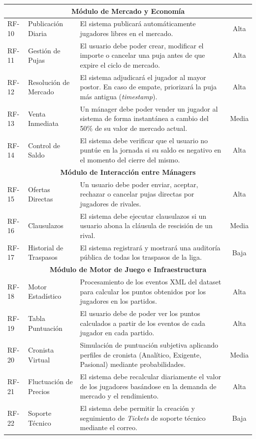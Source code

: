 \begin{center}
\begin{longtable}{|l|p{3.5cm}|p{7cm}|c|}
    \multicolumn{4}{|c|}{\textbf{Módulo de Mercado y Economía}} \\
    \hline
    RF-10 & Publicación Diaria & El sistema publicará automáticamente jugadores libres en el mercado. & Alta \\ \hline
    RF-11 & Gestión de Pujas & El usuario debe poder crear, modificar el importe o cancelar una puja antes de que expire el ciclo de mercado. & Alta \\ \hline
    RF-12 & Resolución de Mercado & El sistema adjudicará el jugador al mayor postor. En caso de empate, priorizará la puja más antigua (\textit{timestamp}). & Alta \\ \hline
    RF-13 & Venta Inmediata & Un mánager debe poder vender un jugador al sistema de forma instantánea a cambio del 50\% de su valor de mercado actual. & Media \\ \hline
    RF-14 & Control de Saldo & El sistema debe verificar que el usuario no puntúe en la jornada si su saldo es negativo en el momento del cierre del mismo. & Alta \\ \hline
    
    \multicolumn{4}{|c|}{\textbf{Módulo de Interacción entre Mánagers}} \\
    \hline
    RF-15 & Ofertas Directas & Un usuario debe poder enviar, aceptar, rechazar o cancelar pujas directas por jugadores de rivales. & Alta \\ \hline
    RF-16 & Clausulazos & El sistema debe ejecutar clausulazos si un usuario abona la cláusula de rescisión de un rival. & Media \\ \hline
    RF-17 & Historial de Traspasos & El sistema registrará y mostrará una auditoría pública de todas los traspasos de la liga. & Baja \\ \hline
    
    \multicolumn{4}{|c|}{\textbf{Módulo de Motor de Juego e Infraestructura}} \\
    \hline
    RF-18 & Motor Estadístico & Procesamiento de los eventos XML del dataset para calcular los puntos obtenidos por los jugadores en los partidos. & Alta \\ \hline
    RF-19 & Tabla Puntuación & El usuario debe de poder ver los puntos calculados a partir de los eventos de cada jugador en cada partido. & Alta \\ \hline
    RF-20 & Cronista Virtual & Simulación de puntuación subjetiva aplicando perfiles de cronista (Analítico, Exigente, Pasional) mediante probabilidades. & Media \\ \hline
    RF-21 & Fluctuación de Precios & El sistema debe recalcular diariamente el valor de los jugadores basándose en la demanda de mercado y el rendimiento. & Alta \\ \hline
    RF-22 & Soporte Técnico & El sistema debe permitir la creación y seguimiento de \textit{Tickets} de soporte técnico mediante el correo. & Baja \\ \hline
\end{longtable}
\end{center}

